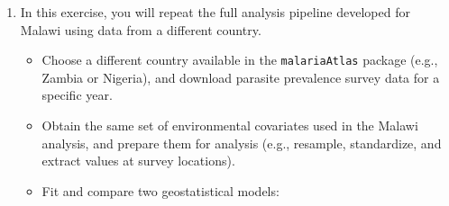 \documentclass[
  letterpaper,
]{krantz}
\begin{document}
\begin{enumerate}
\begin{itemize}
    Use the AnPIT plot and CRPS/SCRPS scores to assess predictive
    performance.
  \item
    Discuss whether adding PC2 captures additional meaningful variation
    or introduces multicollinearity or overfitting. What implications
    does this have for model interpretability and parsimony?
  \end{itemize}
\item
  In this exercise, you will repeat the full analysis pipeline developed
  for Malawi using data from a different country.

  \begin{itemize}
  \item
    Choose a different country available in the \texttt{malariaAtlas}
    package (e.g., Zambia or Nigeria), and download parasite prevalence
    survey data for a specific year.
  \item
    Obtain the same set of environmental covariates used in the Malawi
    analysis, and prepare them for analysis (e.g., resample,
    standardize, and extract values at survey locations).
  \item
    Fit and compare two geostatistical models:


\end{itemize}
\end{enumerate}
\end{document}
